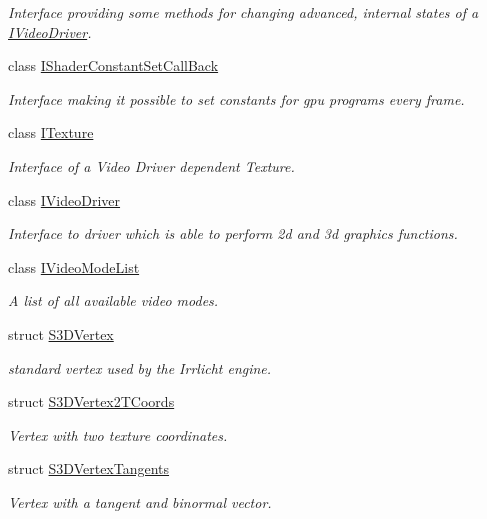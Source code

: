 \begin{DoxyCompactItemize}
\begin{DoxyCompactList}\small\item\em Interface providing some methods for changing advanced, internal states of a \hyperlink{classirr_1_1video_1_1IVideoDriver}{I\+Video\+Driver}. \end{DoxyCompactList}\item 
class \hyperlink{classirr_1_1video_1_1IShaderConstantSetCallBack}{I\+Shader\+Constant\+Set\+Call\+Back}
\begin{DoxyCompactList}\small\item\em Interface making it possible to set constants for gpu programs every frame. \end{DoxyCompactList}\item 
class \hyperlink{classirr_1_1video_1_1ITexture}{I\+Texture}
\begin{DoxyCompactList}\small\item\em Interface of a Video Driver dependent Texture. \end{DoxyCompactList}\item 
class \hyperlink{classirr_1_1video_1_1IVideoDriver}{I\+Video\+Driver}
\begin{DoxyCompactList}\small\item\em Interface to driver which is able to perform 2d and 3d graphics functions. \end{DoxyCompactList}\item 
class \hyperlink{classirr_1_1video_1_1IVideoModeList}{I\+Video\+Mode\+List}
\begin{DoxyCompactList}\small\item\em A list of all available video modes. \end{DoxyCompactList}\item 
struct \hyperlink{structirr_1_1video_1_1S3DVertex}{S3\+D\+Vertex}
\begin{DoxyCompactList}\small\item\em standard vertex used by the Irrlicht engine. \end{DoxyCompactList}\item 
struct \hyperlink{structirr_1_1video_1_1S3DVertex2TCoords}{S3\+D\+Vertex2\+T\+Coords}
\begin{DoxyCompactList}\small\item\em Vertex with two texture coordinates. \end{DoxyCompactList}\item 
struct \hyperlink{structirr_1_1video_1_1S3DVertexTangents}{S3\+D\+Vertex\+Tangents}
\begin{DoxyCompactList}\small\item\em Vertex with a tangent and binormal vector. \end{DoxyCompactList}\item 

\end{DoxyCompactItemize}
